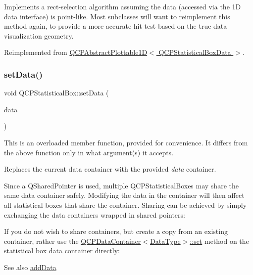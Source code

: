 Implements a rect-\/selection algorithm assuming the data (accessed via the 1D data interface) is point-\/like. Most subclasses will want to reimplement this method again, to provide a more accurate hit test based on the true data visualization geometry.

Reimplemented from \hyperlink{class_q_c_p_abstract_plottable1_d_ac385c38a79e419ed3600c2ee398fd216}{Q\+C\+P\+Abstract\+Plottable1\+D$<$ Q\+C\+P\+Statistical\+Box\+Data $>$}.

\mbox{\label{class_q_c_p_statistical_box_a08a6da55822bad825ee25a8069b9b52f}} 
\subsubsection{\texorpdfstring{set\+Data()}{setData()}\hspace{0.1cm}{\footnotesize\ttfamily [1/2]}}
{\footnotesize\ttfamily void Q\+C\+P\+Statistical\+Box\+::set\+Data (\begin{DoxyParamCaption}\item[{Q\+Shared\+Pointer$<$ \hyperlink{class_q_c_p_data_container}{Q\+C\+P\+Statistical\+Box\+Data\+Container} $>$}]{data }\end{DoxyParamCaption})}

This is an overloaded member function, provided for convenience. It differs from the above function only in what argument(s) it accepts.

Replaces the current data container with the provided {\itshape data} container.

Since a Q\+Shared\+Pointer is used, multiple Q\+C\+P\+Statistical\+Boxes may share the same data container safely. Modifying the data in the container will then affect all statistical boxes that share the container. Sharing can be achieved by simply exchanging the data containers wrapped in shared pointers\+: 
\begin{DoxyCodeInclude}
\end{DoxyCodeInclude}
 If you do not wish to share containers, but create a copy from an existing container, rather use the \hyperlink{class_q_c_p_data_container_ae7042bd534fc3ce7befa2ce3f790b5bf}{Q\+C\+P\+Data\+Container$<$\+Data\+Type$>$\+::set} method on the statistical box data container directly\+: 
\begin{DoxyCodeInclude}
\end{DoxyCodeInclude}
 \begin{DoxySeeAlso}{See also}
\hyperlink{class_q_c_p_statistical_box_a9a8739c5b8291db8fd839e892fc8f478}{add\+Data} 
\end{DoxySeeAlso}
\mbox{\label{class_q_c_p_statistical_box_a4ae198e66243d8cc57ad8893c37bf9d4}} 
